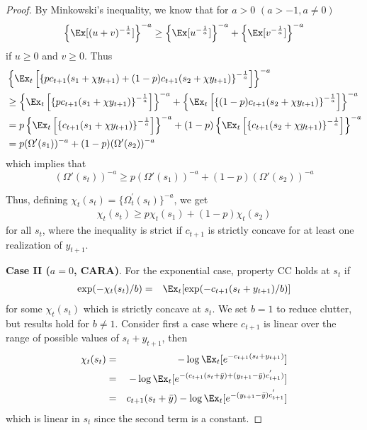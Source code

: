 \documentclass[titlepage]{\econtex}
\begin{document}
\begin{proof}
	By Minkowski's inequality, we know that for $a > 0$ $(a > -1, a \neq 0)$
	\[\left\{\Ex[(u + v)^{-\frac{1}{a}}]\right\}^{-a} \geq \left\{\Ex[u^{-\frac{1}{a}}]\right\}^{-a} + \left\{\Ex[v^{-\frac{1}{a}}]\right\}^{-a}\]
	if $u\geq 0$ and $v\geq 0$. Thus
	\begin{align*}
	&\left\{ \Ex_t \left[\left\{pc_{t+1}(s_1 + \chi{y}_{t+1}) + (1-p) c_{t+1}(s_2 + \chi{y}_{t+1})\right\}^{-\frac{1}{a}}\right]\right\}^{-a} \\ & \geq \left\{ \Ex_t \left[\left\{pc_{t+1}(s_1 + \chi{y}_{t+1})\right\}^{-\frac{1}{a}}\right]\right\}^{-a} + \left\{ \Ex_t \left[\left\{(1-p) c_{t+1}(s_2 + \chi{y}_{t+1})\right\}^{-\frac{1}{a}}\right]\right\}^{-a} \\
	& = p\left\{ \Ex_t \left[\left\{c_{t+1}(s_1 + \chi{y}_{t+1})\right\}^{-\frac{1}{a}}\right]\right\}^{-a} +(1-p) \left\{ \Ex_t \left[\left\{ c_{t+1}(s_2 + \chi{y}_{t+1})\right\}^{-\frac{1}{a}}\right]\right\}^{-a} \\ & = p(\Omega'(s_1))^{-a} + (1-p)(\Omega'(s_2))^{-a}
	\end{align*}
	which implies that 
	\[ (\Omega'(s_t))^{-a} \geq p(\Omega'(s_1))^{-a} + (1-p)(\Omega'(s_2))^{-a}\]
		
	Thus, defining
	$\chi_{t}(s_{t}) = \{\Omega_{t}^{'}(s_{t})\}^{-a}$, we get
	\begin{align*}
	\chi_{t}(s_{t}) \geq p \chi_{t}(s_{1}) + (1-p) \chi_{t}(s_{2})
	\end{align*}
	for all $s_{t}$, where the inequality is strict if $c_{t+1}$ is strictly concave for at least one realization of ${y}_{t+1}$.
	
	\bigskip
	\noindent \textbf{Case II ($a = 0$, CARA)}. For the exponential case, property CC holds at $s_{t}$ if 
	\begin{eqnarray*}
	\exp(-\chi_{t}(s_{t})/b) & = & \Ex_{t}[ \exp(-c_{t+1}(s_{t}+{y}_{t+1})/b)]
	\end{eqnarray*}
	for some $\chi_{t}(s_{t})$ which is strictly concave at $s_{t}$. We set $b = 1$ to reduce clutter, but results hold for $b \neq 1$. Consider first a case where $c_{t+1}$ is linear over the range of possible values of $s_{t}+{y}_{t+1}$, then 
	\begin{eqnarray}
	\chi_{t}(s_{t}) & = & -\log \Ex_{t}[e^{-c_{t+1}(s_{t}+{y}_{t+1})}] \nonumber 
	\\& = & -\log \Ex_{t}[e^{-(c_{t+1}(s_{t}+\bar{y})+({y}_{t+1}-\bar{y})c_{t+1}^{'})}] \nonumber
	\\ & = & c_{t+1}(s_{t}+\bar{y}) - \log \Ex_{t}[e^{-({y}_{t+1}-\bar{y}) c_{t+1}^{'}}] \label{eq:expcdrops}
	\end{eqnarray}
	which is linear in $s_{t}$ since the second term is a constant.  
	

\end{proof}
\end{document}
